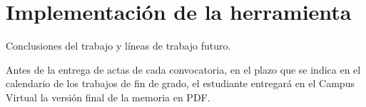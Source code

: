 \chapter{Implementación de la herramienta}
\label{cap:implementacion}

Conclusiones del trabajo y líneas de trabajo futuro.

Antes de la entrega de actas de cada convocatoria, en el plazo que se indica en el calendario de los trabajos de fin de grado, el estudiante entregará en el Campus Virtual la versión final de la memoria en PDF.